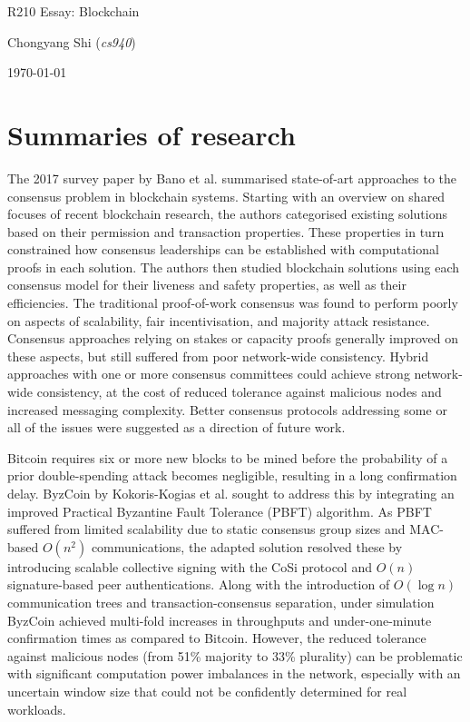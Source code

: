 \documentclass[11pt]{article}
\begin{document}
\centerline{\Large R210 Essay:  Blockchain}
\vspace{2em}
\centerline{\large Chongyang Shi (\emph{cs940})}
\vspace{1em}
\centerline{\large \today}
\vspace{1em}

\section{Summaries of research}

The 2017 survey paper by Bano et al. \cite{bano2017consensus} summarised state-of-art approaches to the consensus problem in blockchain systems. Starting with an overview on shared focuses of recent blockchain research, the authors categorised existing solutions based on their permission and transaction properties. These properties in turn constrained how consensus leaderships can be established with computational proofs in each solution. The authors then studied blockchain solutions using each consensus model for their liveness and safety properties, as well as their efficiencies. The traditional proof-of-work consensus was found to perform poorly on aspects of scalability, fair incentivisation, and majority attack resistance. Consensus approaches relying on stakes or capacity proofs generally improved on these aspects, but still suffered from poor network-wide consistency. Hybrid approaches with one or more consensus committees could achieve strong network-wide consistency, at the cost of reduced tolerance against malicious nodes and increased messaging complexity. Better consensus protocols addressing some or all of the issues were suggested as a direction of future work.

Bitcoin requires six or more new blocks to be mined before the probability of a prior double-spending attack becomes negligible, resulting in a long confirmation delay. ByzCoin by Kokoris-Kogias et al. \cite{kogias2016enhancing} sought to address this by integrating an improved Practical Byzantine Fault Tolerance (PBFT) algorithm. As PBFT suffered from limited scalability due to static consensus group sizes and MAC-based $O(n^2)$ communications, the adapted solution resolved these by introducing scalable collective signing with the CoSi protocol \cite{syta2016keeping} and $O(n)$ signature-based peer authentications. Along with the introduction of $O(\log n)$ communication trees and transaction-consensus separation, under simulation ByzCoin achieved multi-fold increases in throughputs and under-one-minute confirmation times as compared to Bitcoin. However, the reduced tolerance against malicious nodes (from 51\% majority to 33\% plurality) can be problematic with significant computation power imbalances in the network, especially with an uncertain window size that could not be confidently determined for real workloads. 
\end{document}
